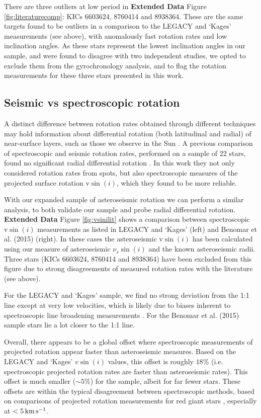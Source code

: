 \documentclass[12pt]{article}
\begin{document}
There are three outliers at low period in  \textbf{Extended Data} Figure \ref{fig:literaturecomp}: KICs 6603624, 8760414 and 8938364. These are the same targets found to be outliers in a comparison to the LEGACY and `Kages' measurements (see above), with anomalously fast rotation rates and low inclination angles. As these stars represent the lowest inclination angles in our sample, and were found to disagree with two independent studies, we opted to exclude them from the gyrochronology analysis, and to flag the rotation measurements for these three stars presented in this work.

\subsection{Seismic vs spectroscopic rotation}
A distinct difference between rotation rates obtained through different techniques may hold information about differential rotation (both latitudinal and radial) of near-surface layers, such as those we observe in the Sun \cite{m_beck2000}.  A previous comparison of spectroscopic and seismic rotation rates, performed on a sample of 22 stars, found no significant radial differential rotation \cite{m_benomar+2018}. In this work they not only considered rotation rates from spots, but also spectroscopic measures of the projected surface rotation $\textrm{v}\sin(i)$, which they found to be more reliable.

With our expanded sample of asteroseismic rotation we can perform a similar analysis, to both validate our sample and probe radial differential rotation.  \textbf{Extended Data} Figure \ref{fig:vsinilit} shows a comparison between spectroscopic $\textrm{v}\sin(i)$ measurements as listed in LEGACY and `Kages' (left) and Benomar et al. (2015) \cite{m_benomar+2015} (right). In these cases the asteroseismic $\textrm{v}\sin(i)$ has been calculated using our measure of asteroseismic $\nu_s\sin(i)$ and the known asteroseismic radii. Three stars (KICs 6603624, 8760414 and 8938364) have been excluded from this figure due to strong disagreements of measured rotation rates with the literature (see above).

For the LEGACY and `Kages' sample, we find no strong deviation from the 1:1 line except at very low velocities, which is likely due to biases inherent to spectroscopic line broadening measurements \cite{m_doyle+2014, m_tayar+2015}. For the Benomar et al. (2015) sample stars lie a lot closer to the 1:1 line.

Overall, there appears to be a global offset where spectroscopic measurements of projected rotation appear faster than asteroseismic measures. Based on the LEGACY and `Kages' $v\sin(i)$ values, this offset is roughly $18\%$ (i.e. spectroscopic projected rotation rates are faster than asteroseismic rates). This offset is much smaller ($\sim5\%$) for the \cite{m_benomar+2015} sample, albeit for far fewer stars. These offsets are within the typical disagreement between spectroscopic methods, based on comparisons of projected rotation measurements for red giant stars \cite[see Figure 2]{m_tayar+2015}, especially at $< 5\, \rm{km\,s^{-1}}$.
\end{document}
